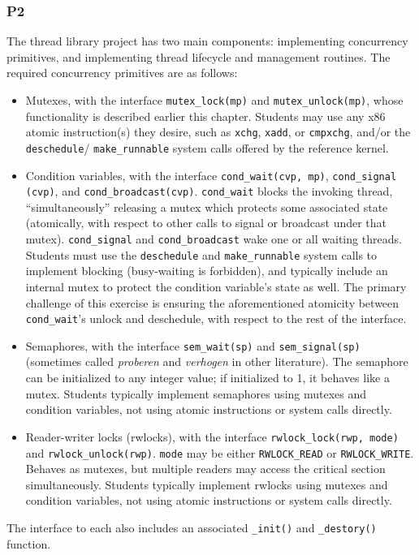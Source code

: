 \subsubsection{P2}
The thread library project \cite{thrlib} has two main components: implementing concurrency primitives, and implementing thread lifecycle and management routines.
The required concurrency primitives are as follows:
\begin{itemize}
	\item Mutexes, with the interface {\tt mutex\_lock(mp)} and {\tt mutex\_unlock(mp)}, whose functionality is described earlier this chapter. Students may use any x86 atomic instruction(s) they desire, such as {\tt xchg}, {\tt xadd}, or {\tt cmpxchg}, and/or the {\tt deschedule}/ {\tt make\_runnable} system calls offered by the reference kernel.
	\item Condition variables, with the interface {\tt cond\_wait(cvp, mp)}, {\tt cond\_signal} {\tt (cvp)}, and {\tt cond\_broadcast(cvp)}. {\tt cond\_wait} blocks the invoking thread, ``simultaneously'' releasing a mutex which protects some associated state (atomically, with respect to other calls to signal or broadcast under that mutex).
		{\tt cond\_signal} and {\tt cond\_broadcast} wake one or all waiting threads.
		Students must use the {\tt deschedule} and {\tt make\_runnable} system calls to implement blocking (busy-waiting is forbidden), and typically include an internal mutex to protect the condition variable's state as well.
		The primary challenge of this exercise is ensuring the aforementioned atomicity between {\tt cond\_wait}'s unlock and deschedule, with respect to the rest of the interface.
	\item Semaphores, with the interface {\tt sem\_wait(sp)} and {\tt sem\_signal(sp)} (sometimes called {\em proberen} and {\em verhogen} in other literature). The semaphore can be initialized to any integer value; if initialized to 1, it behaves like a mutex.
		Students typically implement semaphores using mutexes and condition variables, not using atomic instructions or system calls directly.
	\item Reader-writer locks (rwlocks), with the interface {\tt rwlock\_lock(rwp, mode)} and {\tt rwlock\_unlock(rwp)}. {\tt mode} may be either {\tt RWLOCK\_READ} or {\tt RWLOCK\_\allowbreak{}WRITE}.
		Behaves as mutexes, but multiple readers may access the critical section simultaneously.
		Students typically implement rwlocks using mutexes and condition variables, not using atomic instructions or system calls directly.
\end{itemize}
The interface to each also includes an associated {\tt \_init()} and {\tt \_destory()} function.

